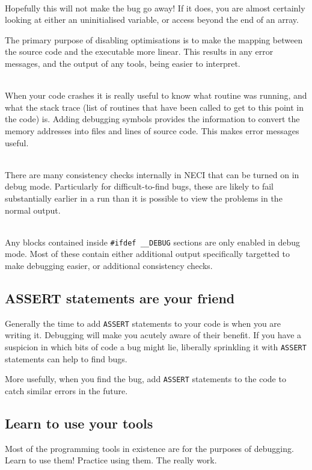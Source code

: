 \documentclass[a4paper,notitlepage]{scrreprt}
\newcommand\headitem[1]{\needspace{1.5\baselineskip}\item[{\boldmath #1 \nopagebreak}] \hfill \\ \nopagebreak}
\let\code\lstinline
\begin{document}
{{{\begin{description}
	\headitem{Disable optimisations}
		Hopefully this will not make the bug go away! If it does, you are
		almost certainly looking at either an uninitialised variable, or access
		beyond the end of an array.

		The primary purpose of disabling optimisations is to make the mapping
		between the source code and the executable more linear. This results
		in any error messages, and the output of any tools, being easier to
		interpret.

	\headitem{Adds debugging symbols}
		When your code crashes it is really useful to know what routine was
		running, and what the stack trace (list of routines that have been
		called to get to this point in the code) is. Adding debugging symbols
		provides the information to convert the memory addresses into files
		and lines of source code. This makes error messages useful.

	\headitem{Enables the {\ttfamily ASSERT} macro}
		There are many consistency checks internally in NECI that can be turned
		on in debug mode. Particularly for difficult-to-find bugs, these are
		likely to fail substantially earlier in a run than it is possible to
		view the problems in the normal output.

	\headitem{Defines {\ttfamily \_\_DEBUG}}
		Any blocks contained inside \code{#ifdef __DEBUG} sections are
		only enabled in debug mode. Most of these contain either additional
		output specifically targetted to make debugging easier, or additional
		consistency checks.
\end{description}

\subsection{{\ttfamily ASSERT} statements are your friend}
	Generally the time to add \code{ASSERT} statements to your code is
	when you are writing it. Debugging will make you acutely aware of their
	benefit. If you have a suspicion in which bits of code a bug might lie,
	liberally sprinkling it with \code{ASSERT} statements can help to
	find bugs.

	More usefully, when you find the bug, add \code{ASSERT} statements to
	the code to catch similar errors in the future.

\subsection{Learn to use your tools}
	Most of the programming tools in existence are for the purposes of
	debugging. Learn to use them! Practice using them. The really work.

}}}
\end{document}
